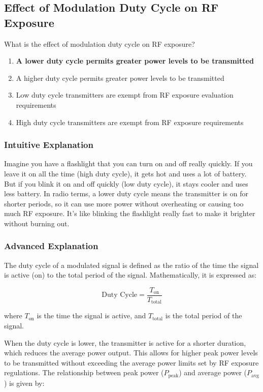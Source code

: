 \subsection{Effect of Modulation Duty Cycle on RF Exposure}
\label{G0A07}

\begin{tcolorbox}[colback=gray!10!white,colframe=black!75!black,title=G0A07]
What is the effect of modulation duty cycle on RF exposure?
\begin{enumerate}[label=\Alph*)]
    \item \textbf{A lower duty cycle permits greater power levels to be transmitted}
    \item A higher duty cycle permits greater power levels to be transmitted
    \item Low duty cycle transmitters are exempt from RF exposure evaluation requirements
    \item High duty cycle transmitters are exempt from RF exposure requirements
\end{enumerate}
\end{tcolorbox}

\subsubsection{Intuitive Explanation}
Imagine you have a flashlight that you can turn on and off really quickly. If you leave it on all the time (high duty cycle), it gets hot and uses a lot of battery. But if you blink it on and off quickly (low duty cycle), it stays cooler and uses less battery. In radio terms, a lower duty cycle means the transmitter is on for shorter periods, so it can use more power without overheating or causing too much RF exposure. It's like blinking the flashlight really fast to make it brighter without burning out.

\subsubsection{Advanced Explanation}
The duty cycle of a modulated signal is defined as the ratio of the time the signal is active (on) to the total period of the signal. Mathematically, it is expressed as:

\[
\text{Duty Cycle} = \frac{T_{\text{on}}}{T_{\text{total}}}
\]

where \( T_{\text{on}} \) is the time the signal is active, and \( T_{\text{total}} \) is the total period of the signal.

When the duty cycle is lower, the transmitter is active for a shorter duration, which reduces the average power output. This allows for higher peak power levels to be transmitted without exceeding the average power limits set by RF exposure regulations. The relationship between peak power (\( P_{\text{peak}} \)) and average power (\( P_{\text{avg}} \)) is given by:

